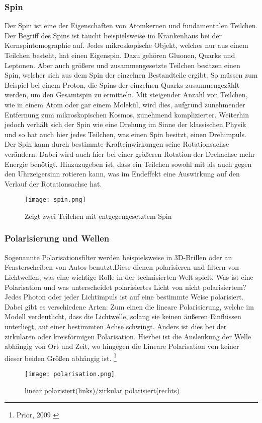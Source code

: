 \documentclass[12pt]{report}
\begin{document}
\subsubsection{Spin}
Der Spin ist eine der Eigenschaften von Atomkernen und fundamentalen Teilchen. Der Begriff des Spins ist taucht beispielsweise im  Krankenhaus bei der Kernspintomographie auf. Jedes mikroskopische Objekt, welches nur aus einem Teilchen besteht, hat einen Eigenspin. Dazu gehören Gluonen, Quarks und Leptonen. Aber auch größere und zusammengesetzte Teilchen besitzen einen Spin, welcher sich aus dem Spin der einzelnen Bestandteile ergibt. So müssen zum Beispiel bei einem Proton, die Spins der einzelnen Quarks zusammengezählt werden, um den Gesamtspin zu ermitteln. Mit steigender Anzahl von Teilchen, wie in einem Atom oder gar einem Molekül, wird dies, aufgrund zunehmender Entfernung zum mikroskopischen Kosmos, zunehmend komplizierter. Weiterhin jedoch verhält sich der Spin wie eine Drehung im Sinne der klassischen Physik und so hat auch hier jedes Teilchen, was einen Spin besitzt, einen Drehimpuls. Der Spin kann durch bestimmte Krafteinwirkungen seine Rotationsachse verändern. Dabei wird auch hier bei einer größeren Rotation der Drehachse mehr Energie benötigt. Hinzuzugeben ist, dass ein Teilchen sowohl mit als auch gegen den Uhrzeigersinn rotieren kann, was im Endeffekt eine Auswirkung auf den Verlauf der Rotationsachse hat. 
\begin{figure}[h]
\centering		
		\texttt{[image: spin.png]}
 	 	\caption{
 	 	Zeigt zwei Teilchen mit entgegengesetztem Spin
 	 	}
\end{figure}

\subsubsection{Polarisierung und Wellen}
Sogenannte Polarisationsfilter werden beispielsweise in 3D-Brillen oder an Fensterscheiben von Autos benutzt.Diese dienen polarisieren und filtern von Lichtwellen, was eine wichtige Rolle in der technisierten Welt spielt. Was ist eine Polarisation und was unterscheidet polarisiertes Licht von nicht polarisiertem? Jedes Photon oder jeder Lichtimpuls ist auf eine bestimmte Weise polarisiert. Dabei gibt es verschiedene Arten: Zum einen die lineare Polarisierung, welche im Modell verdeutlicht, dass die Lichtwelle, solang sie keinen äußeren Einflüssen unterliegt, auf einer bestimmten Achse schwingt. Anders ist dies bei der zirkularen oder kreisförmigen Polarisation. Hierbei ist die Auslenkung der Welle abhängig von Ort und Zeit, wo hingegen die Lineare Polarisation von keiner dieser beiden Größen abhängig ist. \footnote{Prior, 2009 \cite{a222-4}} \newpage 
\begin{figure}[h]
\centering
		\texttt{[image: polarisation.png]}
 	 	\caption{
 	 	linear polarisiert(links)/zirkular polarisiert(rechts) 
 	 	}
\end{figure}
\end{document}

